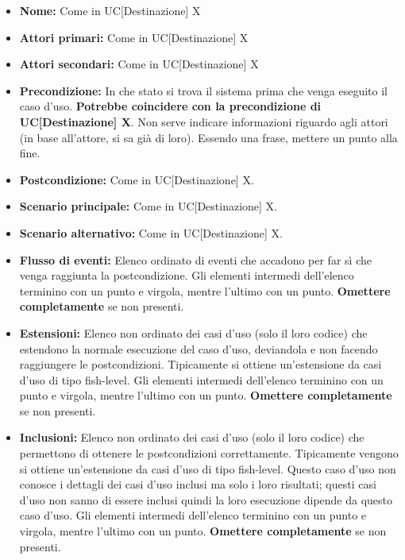 \documentclass[a4paper, oneside]{article} %
\begin{document}
\begin{itemize}
	\item \textbf{Nome:} Come in UC[Destinazione] X
	\item \textbf{Attori primari:} Come in UC[Destinazione] X
	\item \textbf{Attori secondari:} Come in UC[Destinazione] X
	\item \textbf{Precondizione:} In che stato si trova il sistema prima che venga eseguito il caso d'uso. \textbf{Potrebbe coincidere con la precondizione di UC[Destinazione] X}. Non serve indicare informazioni riguardo agli attori (in base all'attore, si sa già di loro). Essendo una frase, mettere un punto alla fine.
	\item \textbf{Postcondizione:} Come in UC[Destinazione] X.
	\item \textbf{Scenario principale:} Come in UC[Destinazione] X.
	\item \textbf{Scenario alternativo:} Come in UC[Destinazione] X.
	\item \textbf{Flusso di eventi:} Elenco ordinato di eventi che accadono per far sì che venga raggiunta la postcondizione. Gli elementi intermedi dell'elenco terminino con un punto e virgola, mentre l'ultimo con un punto. \textbf{Omettere completamente} se non presenti.
	\item \textbf{Estensioni:} Elenco non ordinato dei casi d'uso (solo il loro codice) che estendono la normale esecuzione del caso d'uso, deviandola e non facendo raggiungere le postcondizioni. Tipicamente si ottiene un'estensione da casi d'uso di tipo fish-level. Gli elementi intermedi dell'elenco terminino con un punto e virgola, mentre l'ultimo con un punto. \textbf{Omettere completamente} se non presenti.
	\item \textbf{Inclusioni:} Elenco non ordinato dei casi d'uso (solo il loro codice) che permettono di ottenere le postcondizioni correttamente. Tipicamente vengono si ottiene un'estensione da casi d'uso di tipo fish-level. Questo caso d'uso non conosce i dettagli dei casi d'uso inclusi ma solo i loro risultati; questi casi d'uso non sanno di essere inclusi quindi la loro esecuzione dipende da questo caso d'uso. Gli elementi intermedi dell'elenco terminino con un punto e virgola, mentre l'ultimo con un punto.  \textbf{Omettere completamente} se non presenti.
\end{itemize}
\end{document}
